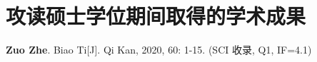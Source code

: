\chapter{攻读硕士学位期间取得的学术成果}

\setlength{\parindent}{0pt} %

\begin{enumerate}[label={[\arabic*]}, leftmargin=*]
    \item \hspace{5pt}\textbf{Zuo Zhe}. Biao Ti[J]. Qi Kan, 2020, 60: 1-15. (SCI 收录, Q1, IF=4.1)
\end{enumerate}
\setlength{\parindent}{2em} %
